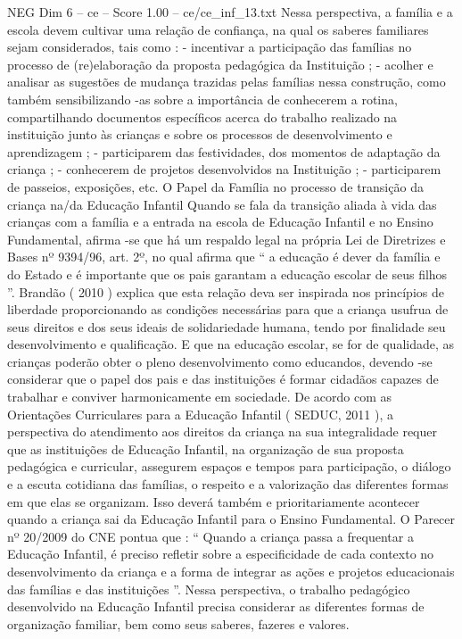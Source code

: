 \begin{textsample}{NEG Dim 6 – ce – Score 1.00 – ce/ce\_inf\_13.txt}
Nessa perspectiva, a família e a escola devem cultivar uma relação de confiança, na qual os saberes familiares sejam considerados, tais como : - incentivar a participação das famílias no processo de (re)elaboração da proposta pedagógica da Instituição ; - acolher e analisar as sugestões de mudança trazidas pelas famílias nessa construção, como também sensibilizando -as sobre a importância de conhecerem a rotina, compartilhando documentos específicos acerca do trabalho realizado na instituição junto às crianças e sobre os processos de desenvolvimento e aprendizagem ; - participarem das festividades, dos momentos de adaptação da criança ; - conhecerem de projetos desenvolvidos na Instituição ; - participarem de passeios, exposições, etc.
O Papel da Família no processo de transição da criança na/da Educação Infantil Quando se fala da transição aliada à vida das crianças com a família e a entrada na escola de Educação Infantil e no Ensino Fundamental, afirma -se que há um respaldo legal na própria Lei de Diretrizes e Bases nº 9394/96, art. 2º, no qual afirma que “ a educação é dever da família e do Estado e é importante que os pais garantam a educação escolar de seus filhos ”.
Brandão ( 2010 ) explica que esta relação deva ser inspirada nos princípios de liberdade proporcionando as condições necessárias para que a criança usufrua de seus direitos e dos seus ideais de solidariedade humana, tendo por finalidade seu desenvolvimento e qualificação.
E que na educação escolar, se for de qualidade, as crianças poderão obter o pleno desenvolvimento como educandos, devendo -se considerar que o papel dos pais e das instituições é formar cidadãos capazes de trabalhar e conviver harmonicamente em sociedade.
De acordo com as Orientações Curriculares para a Educação Infantil ( SEDUC, 2011 ), a perspectiva do atendimento aos direitos da criança na sua integralidade requer que as instituições de Educação Infantil, na organização de sua proposta pedagógica e curricular, assegurem espaços e tempos para participação, o diálogo e a escuta cotidiana das famílias, o respeito e a valorização das diferentes formas em que elas se organizam.
Isso deverá também e prioritariamente acontecer quando a criança sai da Educação Infantil para o Ensino Fundamental.
O Parecer nº 20/2009 do CNE pontua que : “ Quando a criança passa a frequentar a Educação Infantil, é preciso refletir sobre a especificidade de cada contexto no desenvolvimento da criança e a forma de integrar as ações e projetos educacionais das famílias e das instituições ”.
Nessa perspectiva, o trabalho pedagógico desenvolvido na Educação Infantil precisa considerar as diferentes formas de organização familiar, bem como seus saberes, fazeres e valores.

\end{textsample}

